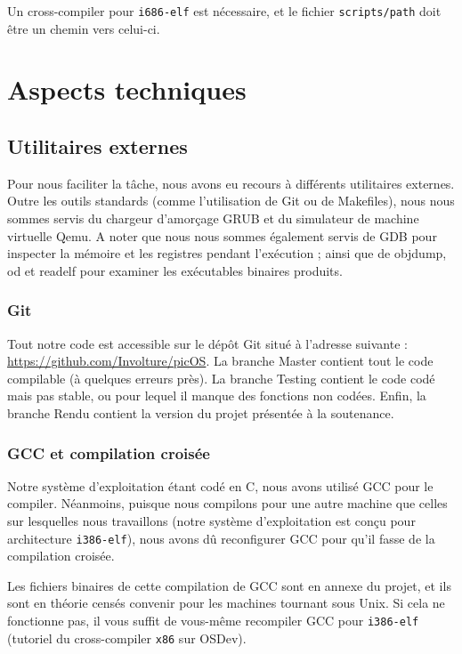 \documentclass[a4paper, 11pt, twoside]{article}
\begin{document}
Un cross-compiler pour \texttt{i686-elf} est nécessaire, et le fichier \texttt{scripts/path} doit être un chemin vers celui-ci.

\section{Aspects techniques}

\subsection{Utilitaires externes}

Pour nous faciliter la tâche, nous avons eu recours à différents utilitaires
externes. Outre les outils standards (comme l'utilisation de Git ou de
Makefiles), nous nous sommes servis du chargeur d'amorçage GRUB et du simulateur
de machine virtuelle Qemu. A noter que nous nous sommes également servis de GDB pour inspecter la mémoire et les registres pendant l'exécution ; ainsi que de objdump, od et readelf pour examiner les exécutables binaires produits.

\subsubsection{Git}

Tout notre code est accessible sur le dépôt Git situé à l'adresse suivante :
\url{https://github.com/Involture/picOS}. La branche Master contient tout le
code compilable (à quelques erreurs près). La branche Testing contient le code
codé mais pas stable, ou pour lequel il manque des fonctions non codées. Enfin,
la branche Rendu contient la version du projet présentée à la soutenance.

\subsubsection{GCC et compilation croisée}

Notre système d'exploitation étant codé en C, nous avons utilisé GCC pour le
compiler. Néanmoins, puisque nous compilons pour une autre machine que celles
sur lesquelles nous travaillons (notre système d'exploitation est conçu pour
architecture \texttt{i386-elf}), nous avons dû reconfigurer GCC pour qu'il fasse de la
compilation croisée.

Les fichiers binaires de cette compilation de GCC sont en annexe du projet, et
ils sont en théorie censés convenir pour les machines tournant sous Unix. Si
cela ne fonctionne pas, il vous suffit de vous-même recompiler GCC pour
\texttt{i386-elf} (tutoriel du cross-compiler \texttt{x86} sur OSDev).
\end{document}
